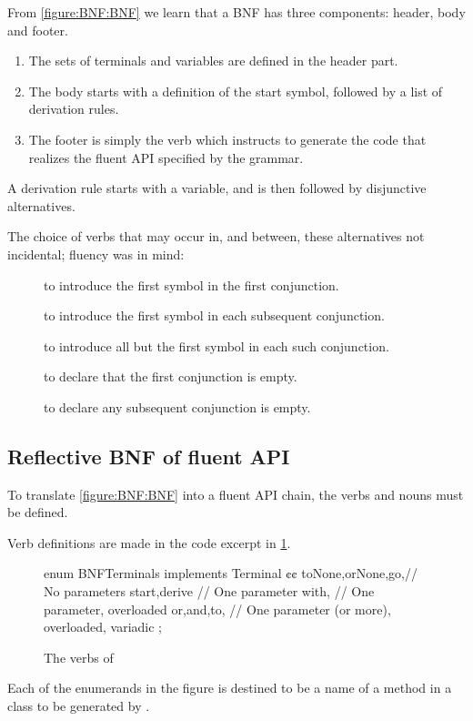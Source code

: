 From \cref{figure:BNF:BNF} we learn
  that a BNF has three components: header, body and footer.
  \begin{enumerate}
    \item The sets of terminals and variables are defined in the header part.
    \item The body starts with a definition of the start symbol, followed by a list of derivation
  rules.
\item The footer is simply the verb  which instructs \Self
  to generate the code that realizes the fluent API specified by the grammar.
  \end{enumerate}

A derivation rule starts with a variable, and is then followed by disjunctive alternatives.

The choice of verbs that may occur in, and between, these alternatives not incidental;
  fluency was in mind:
\begin{description}
  \item[] to introduce the first symbol in the first conjunction.
  \item[] to introduce the first symbol in each subsequent conjunction.
  \item[] to introduce all but the first symbol in each such conjunction.
  \item[] to declare that the first conjunction is empty.
  \item[] to declare any subsequent conjunction is empty.
\end{description}

\subsection{Reflective BNF of fluent API}

To translate \cref{figure:BNF:BNF} into a fluent
API chain, the verbs and nouns must be defined.

Verb definitions are made in the code excerpt in
\cref{figure:Verbs}.

\begin{figure}[htb]
  \begin{JAVA}[style=code]
enum BNFTerminals implements Terminal {¢¢
  toNone,orNone,go,// No parameters
  start,derive     // One parameter
  with,            // One parameter, overloaded
  or,and,to,       // One parameter (or more), overloaded, variadic
  ;
}\end{JAVA}
  \caption{The verbs of \Self}
  \label{figure:Verbs}
\end{figure}
Each of the enumerands in the figure is destined to be a
  name of a method in a class to be generated by \Self.

